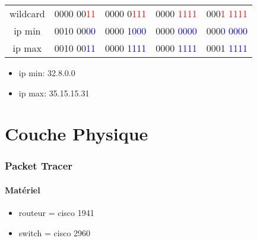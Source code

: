\documentclass[a4paper]{article}
\begin{document}
\begin{itemize}
\begin{example}
\begin{center}
\begin{tabular}{crrrr}
                wildcard & 0000 00\textcolor{red}{11} & 0000 0\textcolor{red}{111} & 0000 \textcolor{red}{1111} & 000\textcolor{red}{1 1111} \\
                ip min & 0010 00\textcolor{blue}{00} & 0000 1\textcolor{blue}{000} & 0000 \textcolor{blue}{0000} & 000\textcolor{blue}{0 0000} \\
                ip max & 0010 00\textcolor{blue}{11} & 0000 1\textcolor{blue}{111} & 0000 \textcolor{blue}{1111} & 000\textcolor{blue}{1 1111} \\
            \end{tabular}
        \end{center}
        \begin{itemize}
            \item ip min: 32.8.0.0
            \item ip max: 35.15.15.31
        \end{itemize}
    \end{example}
\end{itemize}















\part{Couche Physique}










\section{Packet Tracer}





\subsection{Matériel}



\begin{itemize}
    \item routeur = cisco 1941
    \item switch = cisco 2960
\end{itemize}
\end{document}
